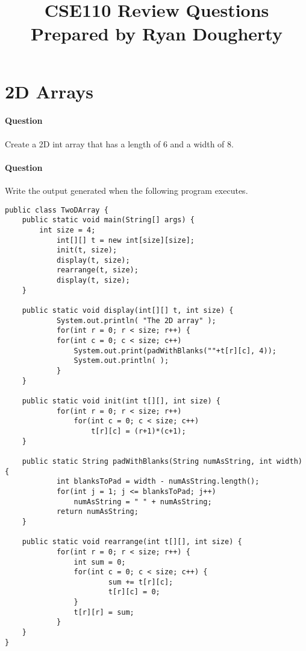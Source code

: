 \documentclass{article}
\date{}
\begin{document}
\title{\textbf{CSE110 Review Questions \\
Prepared by Ryan Dougherty}}
\maketitle

\section*{2D Arrays}


\setcounter{question_num}{1}
\paragraph{Question }
Create a 2D int array that has a length of 6 and a width of 8.

\addtocounter{question_num}{1}
\paragraph{Question }
Write the output generated when the following program executes.
\begin{lstlisting}
public class TwoDArray {
	public static void main(String[] args) {
		int size = 4;
    		int[][] t = new int[size][size];
    		init(t, size);
    		display(t, size);
    		rearrange(t, size);
    		display(t, size);
  	}

  	public static void display(int[][] t, int size) {
    		System.out.println( "The 2D array" );
    		for(int r = 0; r < size; r++) {
			for(int c = 0; c < size; c++)
				System.out.print(padWithBlanks(""+t[r][c], 4));
      			System.out.println( );
    		}
  	}

  	public static void init(int t[][], int size) {
    		for(int r = 0; r < size; r++)
      			for(int c = 0; c < size; c++)
       				t[r][c] = (r+1)*(c+1);
  	}

  	public static String padWithBlanks(String numAsString, int width) {
    		int blanksToPad = width - numAsString.length();
    		for(int j = 1; j <= blanksToPad; j++)
      			numAsString = " " + numAsString;
    		return numAsString;
  	}

  	public static void rearrange(int t[][], int size) {
    		for(int r = 0; r < size; r++) {
      			int sum = 0;
      			for(int c = 0; c < size; c++) {
        				sum += t[r][c];
        				t[r][c] = 0;
      			}
      			t[r][r] = sum;
    		}
  	}
}
\end{lstlisting}
\end{document}
